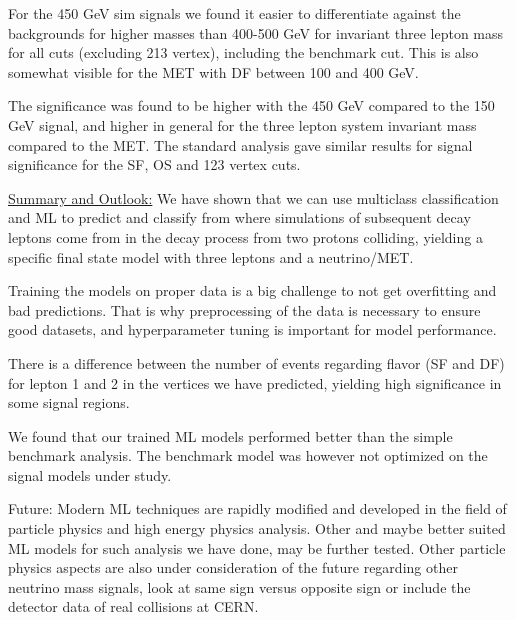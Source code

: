 \documentclass[a4paper, american, 12pt]{report}
\begin{document}
	For the 450 GeV sim signals we found it easier to differentiate against the backgrounds for higher masses than 400-500 GeV for invariant three lepton mass for all cuts (excluding 213 vertex), including the benchmark cut. This is also somewhat visible for the MET with DF between 100 and 400 GeV.
	
	The significance was found to be higher with the 450 GeV compared to the 150 GeV signal, and higher in general for the three lepton system invariant mass compared to the MET. The standard analysis gave similar results for signal significance for the SF, OS and 123 vertex cuts. 
	
	
	\underline{Summary and Outlook:}
	We have shown that we can use multiclass classification and ML to predict and classify from where simulations of subsequent decay leptons come from in the decay process from two protons colliding, yielding a specific final state model with three leptons and a neutrino/MET.
	
	Training the models on proper data is a big challenge to not get overfitting and bad predictions. That is why preprocessing of the data is necessary to ensure good datasets, and hyperparameter tuning is important for model performance.
	
	There is a difference between the number of events regarding flavor (SF and DF) for lepton 1 and 2 in the vertices we have predicted, yielding high significance in some signal regions. 
	
	We found that our trained ML models performed better than the simple benchmark analysis. The benchmark model was however not optimized on the signal models under study.
	
	Future: Modern ML techniques are rapidly modified and developed in the field of particle physics and high energy physics analysis. Other and maybe better suited ML models for such analysis we have done, may be further tested. Other particle physics aspects are also under consideration of the future regarding other neutrino mass signals, look at same sign versus opposite sign or include the detector data of real collisions at CERN.
	
	
\end{document}
